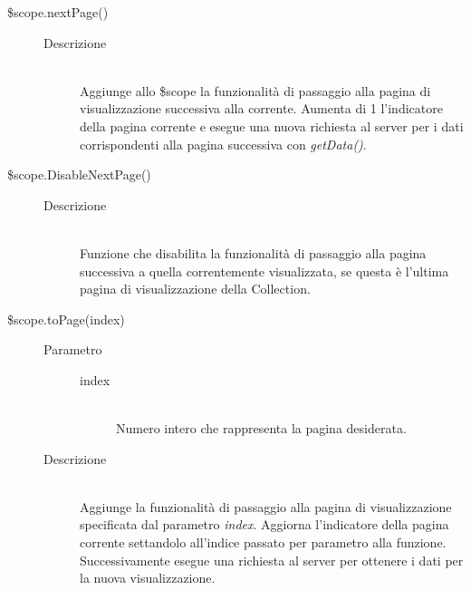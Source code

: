 \begin{description}
\begin{description}
  \item[\$scope.nextPage()] \hfill
    \begin{description}
  	\item[Descrizione] \hfill \\
  Aggiunge allo \$scope la funzionalità di passaggio alla pagina di visualizzazione successiva alla corrente.
  Aumenta di 1 l'indicatore della pagina corrente e esegue una nuova richiesta al server per i dati corrispondenti alla pagina successiva con \textit{getData()}.
      \end{description}
      
  \item[\$scope.DisableNextPage()] \hfill
  \begin{description}
  	\item[Descrizione] \hfill \\
  	Funzione che disabilita la funzionalità di passaggio alla pagina successiva a quella correntemente visualizzata, se questa è l'ultima pagina di visualizzazione della Collection.
  \end{description}

  \item[\$scope.toPage(index)] \hfill
  \begin{description}
  	\item[Parametro] \hfill
  		\begin{description}
  			\item[index] \hfill \\
  			Numero intero che rappresenta la pagina desiderata.
       \end{description}
  	\item[Descrizione] \hfill \\
       Aggiunge la funzionalità di passaggio alla pagina di visualizzazione specificata dal parametro \textit{index}. Aggiorna l'indicatore della pagina corrente settandolo all'indice passato per parametro alla funzione. Successivamente esegue una richiesta al server per ottenere i dati per la nuova visualizzazione.
    \end{description}
 \end{description}
\end{description}

